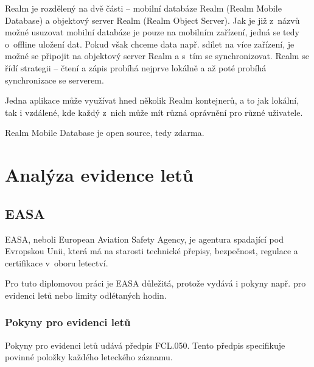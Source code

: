 \documentclass[thesis=M,czech]{FITthesis}[2012/06/26]
\begin{document}
Realm je rozdělený na dvě části -- mobilní databáze Realm (Realm Mobile Database) a objektový server Realm (Realm Object Server). Jak je již z~názvů možné usuzovat mobilní databáze je pouze na mobilním zařízení, jedná se tedy o~offline uložení dat. Pokud však chceme data např. sdílet na více zařízení, je možné se připojit na objektový server Realm a s~tím se synchronizovat. Realm se řídí strategii  -- čtení a zápis probíhá nejprve lokálně a až poté probíhá synchronizace se serverem.

Jedna aplikace může využívat hned několik Realm kontejnerů, a to jak lokální, tak i vzdálené, kde každý z~nich může mít různá oprávnění pro různé uživatele.

Realm Mobile Database je open source, tedy zdarma. \cite{realmOverview}

\chapter{Analýza evidence letů}
\section{EASA}
EASA, neboli European Aviation Safety Agency, je agentura spadající pod Evropskou Unii, která má na starosti technické přepisy, bezpečnost, regulace a certifikace v~oboru letectví. \cite{EU} 

Pro tuto diplomovou práci je EASA důležitá, protože vydává i pokyny např. pro evidenci letů nebo limity odlétaných hodin. \cite{EASARegulations}

\subsection{Pokyny pro evidenci letů}
Pokyny pro evidenci letů udává předpis FCL.050. Tento předpis specifikuje povinné položky každého leteckého záznamu. \cite{FCL} 
\end{document}
